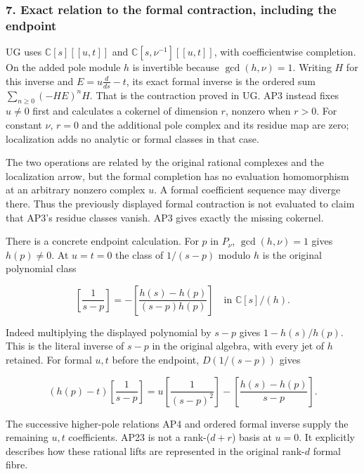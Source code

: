 \subsubsection{7. Exact relation to the formal contraction, including the endpoint}\label{endpoint-analytic_pole--exact-relation-to-the-formal-contraction-including-the-endpoint}

UG uses \(\mathbb C[s][[u,t]]\) and \(\mathbb C[s,\nu^{-1}][[u,t]]\), with coefficientwise completion. On the added pole module \(h\) is invertible because \(\gcd(h,\nu)=1\). Writing \(H\) for this inverse and \(E=u\frac{d}{ds}-t\), its exact formal inverse is the ordered sum \(\sum_{n\ge0}(-HE)^n H\). That is the contraction proved in UG. AP3 instead fixes \(u\ne0\) first and calculates a cokernel of dimension \(r\), nonzero when \(r>0\). For constant \(\nu\), \(r=0\) and the additional pole complex and its residue map are zero; localization adds no analytic or formal classes in that case.

The two operations are related by the original rational complexes and the localization arrow, but the formal completion has no evaluation homomorphism at an arbitrary nonzero complex \(u\). A formal coefficient sequence may diverge there. Thus the previously displayed formal contraction is not evaluated to claim that AP3's residue classes vanish. AP3 gives exactly the missing cokernel.

There is a concrete endpoint calculation. For \(p\) in \(P_\nu\), \(\gcd(h,\nu)=1\) gives \(h(p)\ne0\). At \(u=t=0\) the class of \(1/(s-p)\) modulo \(h\) is the original polynomial class

\[
\left[\frac{1}{s-p}\right]
=-\left[\frac{h(s)-h(p)}{(s-p)h(p)}\right]
\quad\text{in }\mathbb C[s]/(h).
\tag{AP23}
\]

Indeed multiplying the displayed polynomial by \(s-p\) gives \(1-h(s)/h(p)\). This is the literal inverse of \(s-p\) in the original algebra, with every jet of \(h\) retained. For formal \(u,t\) before the endpoint, \(D(1/(s-p))\) gives

\[
(h(p)-t)\left[\frac{1}{s-p}\right]
=u\left[\frac{1}{(s-p)^2}\right]
-\left[\frac{h(s)-h(p)}{s-p}\right].
\tag{AP24}
\]

The successive higher-pole relations AP4 and ordered formal inverse supply the remaining \(u,t\) coefficients. AP23 is not a rank-(\(d+r\)) basis at \(u=0\). It explicitly describes how these rational lifts are represented in the original rank-\(d\) formal fibre.

